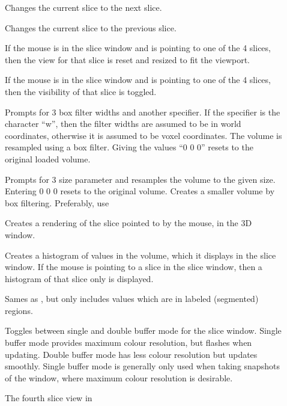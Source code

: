 \begin{description}
\item[]  Changes the current slice to the next slice.
\item[]  Changes the current slice to the previous slice.
\item[]  If the mouse is in the slice
   window and is pointing to one of the 4 slices, then the view for
   that slice is reset and resized to fit the viewport.
\item[]  If the mouse is in the slice
   window and is pointing to one of the 4 slices, then the visibility
   of that slice is toggled.
\item[]  Prompts for 3 box filter
       widths and another specifier.  If the specifier is the
       character ``w'', then the
       filter widths are assumed to be in world coordinates, otherwise
       it is assumed to be voxel coordinates.  The volume is resampled
       using a box filter.  Giving the values ``0 0 0'' resets to the
       original loaded volume.
\item[]  Prompts for 3 size parameter and
       resamples the volume to the given size.  Entering 0 0 0 resets to
       the original volume.  Creates a smaller volume by box
       filtering.  Preferably, use 
\item[]  Creates a rendering of the slice
       pointed to by the mouse, in the 3D window.
\item[]  Creates a histogram of
       values in the volume, which it displays in the slice window.
       If the mouse is pointing to a slice in the slice window, then a
       histogram of that slice only is displayed.
\item[]  Sames as
       , but only includes values
       which are in labeled (segmented) regions.
\item[]  Toggles between single and double buffer
       mode for the slice window.  Single buffer mode provides maximum
       colour resolution, but flashes when updating.  Double buffer
       mode has less colour resolution but updates smoothly.  Single
       buffer mode is generally only used when taking snapshots of the
       window, where maximum colour resolution is desirable.
\item[]  The fourth slice view in

\end{description}
